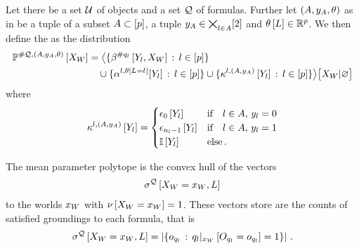 \begin{definition}
    Let there be a set $\mathcal{U}$ of objects and a set $\mathcal{Q}$ of \firstOrderLogic{} formulas.
    Further let $(A,y_{A},\theta)$ as in  be a tuple of a subset $A\subset[p]$, a tuple $y_{A}\in\bigtimes_{l\in A}[2]$ and $\theta\left[L\right]\in\mathbb{R}^{p}$.
    We then define the \HybridFOLNetwork{} as the distribution
    \begin{align*}
        \mathbb{P}^{\#\mathcal{Q},(A,y_{A},\theta)}\left[X_{W}\right]
        &= \big\langle \{\beta^{\#q_{l}}\left[Y_{l},X_{W}\right]\,:\,l\in[p]\} \\
        & \quad \cup \{\alpha^{l,\theta\left[L_{}=l_{}\right]}[Y_{l}]\,:\,l\in[p]\}
        \cup \{\kappa^{l,(A,y_{A})}\left[Y_{l}\right]\,:\,l\in[p]\}
         \big\rangle \big[ X_{W} | \varnothing \big]
    \end{align*}
    where
    \begin{align*}
        \kappa^{l,(A,y_{A})}\left[Y_{l}\right]
        = \begin{cases}
              \epsilon_0\left[Y_{l}\right] & \text{if}\quad l\in A ,\, y_{l} = 0 \\
              \epsilon_{n_{l}-1}\left[Y_{l}\right] & \text{if}\quad l\in A ,\, y_{l} = 1 \\
              \mathbb{I}\left[Y_{l}\right] & \text{else} \, .
        \end{cases}
    \end{align*}
\end{definition}



The mean parameter polytope is the convex hull of the vectors
\begin{align*}
    \sigma^{\mathcal{Q}}\left[X_{W}=x_{W},L\right]
\end{align*}
to the worlds $x_{W}$ with $\nu\left[X_{W}=x_{W}\right]=1$.
These vectors store are the counts of satisfied groundings to each formula, that is
\begin{align*}
    \sigma^{\mathcal{Q}}\left[X_{W}=x_{W},L\right] = \left|
        \{o_{q_{l}} \,:\, {q_{l}}|_{x_{W}} \left[O_{q_{l}}=o_{q_{l}}\right] = 1 \}
    \right| \, .
\end{align*}


